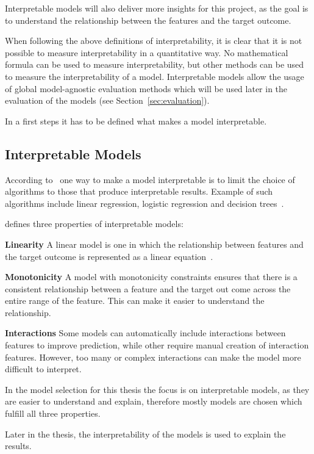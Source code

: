 Interpretable models will also deliver more insights for this project, as the goal is to
understand the relationship between the features and the target outcome.

When following the above definitions of interpretability, it is clear that it is not possible to
measure interpretability in a quantitative way.
No mathematical formula can be used to measure interpretability, but other methods can be used to
measure the interpretability of a model.
Interpretable models allow the usage of global model-agnostic evaluation methods which will be
used later in the evaluation of the models (see Section~\ref{sec:evaluation}).

In a first steps it has to be defined what makes a model interpretable.

\subsection*{Interpretable Models}
According to~\cite{molnar2020interpretable} one way to make a model interpretable is to limit the
choice of algorithms to those that produce interpretable results. Example of such
algorithms include linear regression, logistic regression and decision trees~\cite[p.
35]{molnar2020interpretable}.

\cite{molnar2020interpretable} defines three properties of interpretable models:

\textbf{Linearity} A linear model is one in which the relationship between features and the
target outcome is represented as a linear equation~\cite[]{molnar2020interpretable}.

\textbf{Monotonicity} A model with monotonicity constraints ensures that there is a consistent
relationship between a feature and the target out come across the entire range of the feature.
This can make it easier to understand the relationship.

\textbf{Interactions} Some models can automatically include
interactions between features to improve prediction, while other require manual creation of
interaction features.
However, too many or complex interactions can make the model more
difficult to interpret.

In the model selection for this thesis the focus is on interpretable models, as they are easier to
understand and explain, therefore mostly models are chosen which fulfill all three
properties.

Later in the thesis, the interpretability of the models is used to explain the results.

